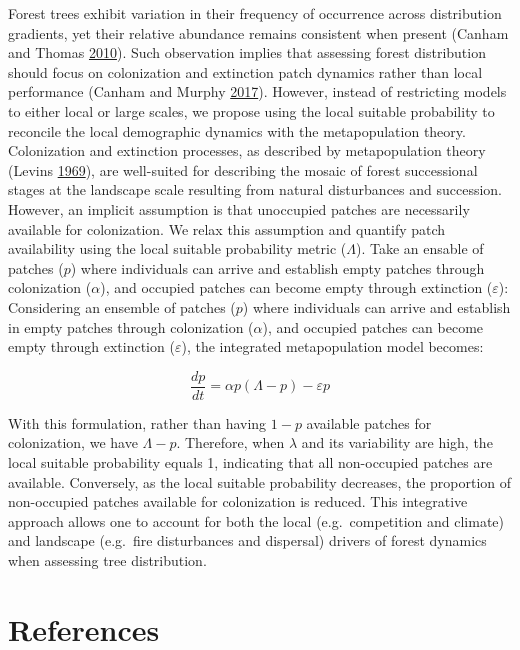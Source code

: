 \documentclass[12pt]{article}
\begin{document}
Forest trees exhibit variation in their frequency of occurrence across
distribution gradients, yet their relative abundance remains consistent
when present (Canham and Thomas
\protect\hyperlink{ref-Canham2010}{2010}). Such observation implies that
assessing forest distribution should focus on colonization and
extinction patch dynamics rather than local performance (Canham and
Murphy \protect\hyperlink{ref-Canham2017}{2017}). However, instead of
restricting models to either local or large scales, we propose using the
local suitable probability to reconcile the local demographic dynamics
with the metapopulation theory. Colonization and extinction processes,
as described by metapopulation theory (Levins
\protect\hyperlink{ref-Levins1969}{1969}), are well-suited for
describing the mosaic of forest successional stages at the landscape
scale resulting from natural disturbances and succession. However, an
implicit assumption is that unoccupied patches are necessarily available
for colonization. We relax this assumption and quantify patch
availability using the local suitable probability metric (\(\Lambda\)).
Take an ensable of patches (\(p\)) where individuals can arrive and
establish empty patches through colonization (\(\alpha\)), and occupied
patches can become empty through extinction (\(\varepsilon\)):
Considering an ensemble of patches (\(p\)) where individuals can arrive
and establish in empty patches through colonization (\(\alpha\)), and
occupied patches can become empty through extinction (\(\varepsilon\)),
the integrated metapopulation model becomes:

\[
\frac{dp}{dt} = \alpha p (\Lambda - p) - \varepsilon p
\]

With this formulation, rather than having \(1 - p\) available patches
for colonization, we have \(\Lambda - p\). Therefore, when \(\lambda\)
and its variability are high, the local suitable probability equals 1,
indicating that all non-occupied patches are available. Conversely, as
the local suitable probability decreases, the proportion of non-occupied
patches available for colonization is reduced. This integrative approach
allows one to account for both the local (e.g.~competition and climate)
and landscape (e.g.~fire disturbances and dispersal) drivers of forest
dynamics when assessing tree distribution.

\hypertarget{references}{%
\section*{References}\label{references}}
\end{document}
